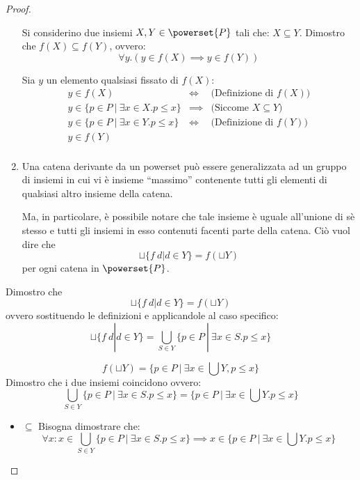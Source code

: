\begin{proof}
\begin{enumerate}
    Si considerino due insiemi $X, Y \in \powerset{P}$ tali che:
    $X \subseteq Y$. Dimostro che $f(X) \subseteq f(Y)$, ovvero:
    $$
    \forall y.(y \in f(X) \implies y \in f(Y))
    $$
    
    Sia $y$ un elemento qualsiasi fissato di $f(X)$:
    $$
    \begin{array}{llr}
     y \in f(X) & \iff & \text{(Definizione di $f(X))$}\\
     y \in \{p \in P\ |\ \exists x \in X. p \leq x \} & \implies & \text{(Siccome $X \subseteq Y$) } \\
     y \in \{p \in P\ |\ \exists x \in Y. p \leq x \} & \iff &
     \text{(Definizione di $f(Y)$)} \\
     y \in f(Y) & & \\
    \end{array}
    $$
    
    
  \item Una catena derivante da un powerset può essere generalizzata ad un
    gruppo di insiemi in cui  vi è insieme ``massimo'' contenente tutti gli
    elementi di qualsiasi altro insieme della catena.

	

    Ma, in particolare, è possibile notare che tale insieme è uguale all'unione
    di sè stesso e tutti gli insiemi in esso contenuti facenti parte della
    catena. Ciò vuol dire che
    $$
    \sqcup\{f\ d | d \in Y\} = f(\sqcup Y)
    $$
    per ogni catena in $\powerset{P}$.
\end{enumerate}

Dimostro che 
$$
\sqcup\{f\ d | d \in Y\} = f(\sqcup Y)
$$
ovvero sostituendo le definizioni e applicandole al caso specifico:
$$
\sqcup\{f\ d | d \in Y\} =
  \bigcup_{S \in Y} \{p \in P\ |\ \exists x \in S. p \leq x\}
$$

$$
f(\sqcup Y) = \{p \in P\ |\ \exists x \in \bigcup Y, p \leq x\}
$$
Dimostro che i due insiemi coincidono ovvero:
$$
\bigcup_{S \in Y} \{p \in P\ |\ \exists x \in S. p \leq x\} =  \{p \in P\ |\ \exists x \in \bigcup Y. p \leq x\}
$$
\begin{itemize}
	\item $\boxed{\subseteq}$ Bisogna dimostrare che:
	$$
	\forall x : x \in \bigcup_{S \in Y} \{p \in P\ |\ \exists x \in S. p \leq x\} \implies x \in \{p \in P\ |\ \exists x \in \bigcup Y. p \leq x\}
	$$
	

\end{itemize}
\end{proof}
